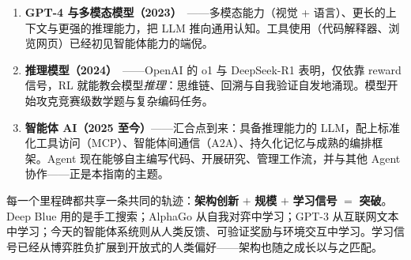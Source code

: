 \documentclass[11pt,a4paper,openany]{book}
\begin{document}
\begin{enumerate}
  \item \textbf{GPT-4 与多模态模型（2023）}~\cite{openai2023gpt4}——多模态能力（视觉 + 语言）、更长的上下文与更强的推理能力，把 LLM 推向通用认知。工具使用（代码解释器、浏览网页）已经初见智能体能力的端倪。
  \item \textbf{推理模型（2024）}~\cite{deepseek2025r1}——OpenAI 的 o1 与 DeepSeek-R1 表明，仅依靠 reward 信号，RL 就能教会模型\emph{推理}：思维链、回溯与自我验证自发地涌现。模型开始攻克竞赛级数学题与复杂编码任务。
  \item \textbf{智能体 AI（2025 至今）}——汇合点到来：具备推理能力的 LLM，配上标准化工具访问（MCP）、智能体间通信（A2A）、持久化记忆与成熟的编排框架。Agent 现在能够自主编写代码、开展研究、管理工作流，并与其他 Agent 协作——正是本指南的主题。
\end{enumerate}

\begin{intuitionbox}
每一个里程碑都共享一条共同的轨迹：\textbf{架构创新} $+$ \textbf{规模} $+$ \textbf{学习信号} $=$ \textbf{突破}。Deep Blue 用的是手工搜索；AlphaGo 从自我对弈中学习；GPT-3 从互联网文本中学习；今天的智能体系统则从人类反馈、可验证奖励与环境交互中学习。学习信号已经从博弈胜负扩展到开放式的人类偏好——架构也随之成长以与之匹配。
\end{intuitionbox}
\end{document}
